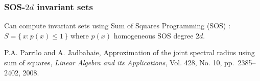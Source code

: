 \documentclass{beamer}
\begin{document}
  \begin{frame}
    \frametitle{SOS-$2d$ invariant sets}
    Can compute invariant sets using Sum of Squares Programming (SOS) :
    $S = \{\, x : p(x) \leq 1\,\}$ where $p(x)$ homogeneous %
    SOS degree $2d$.
  
    \vfill
    {\scriptsize
    P.A. Parrilo and A. Jadbabaie,
    Approximation of the joint spectral radius using sum of squares,
    \emph{Linear Algebra and its Applications},
    Vol. 428, No. 10, pp.~2385--2402, 2008.
    }
  \end{frame}
\end{document}
